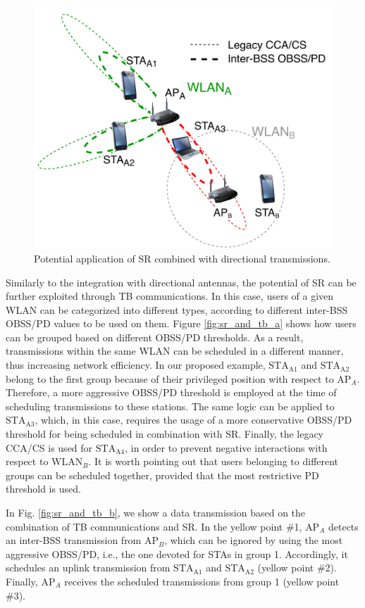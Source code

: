 \documentclass[preprint,12pt]{elsarticle}
\begin{document}
	\begin{figure}[ht!]
		\centering		
		\includegraphics[width=0.4\columnwidth]{sr_and_beamforming}
		\caption{Potential application of SR combined with directional transmissions.}
		\label{fig:sr_and_beamforming}
	\end{figure}
	
	Similarly to the integration with directional antennas, the potential of SR can be further exploited through TB communications. In this case, users of a given WLAN can be categorized into different types, according to different inter-BSS OBSS/PD values to be used on them. Figure \ref{fig:sr_and_tb_a} shows how users can be grouped based on different OBSS/PD thresholds. As a result, transmissions within the same WLAN can be scheduled in a different manner, thus increasing network efficiency. In our proposed example, $\text{STA}_\text{A1}$ and $\text{STA}_\text{A2}$ belong to the first group because of their privileged position with respect to $\text{AP}_A$. Therefore, a more aggressive OBSS/PD threshold is employed at the time of scheduling transmissions to these stations. The same logic can be applied to $\text{STA}_\text{A3}$, which, in this case, requires the usage of a more conservative OBSS/PD threshold for being scheduled in combination with SR. Finally, the legacy CCA/CS is used for $\text{STA}_\text{A4}$, in order to prevent negative interactions with respect to $\text{WLAN}_B$. It is worth pointing out that users belonging to different groups can be scheduled together, provided that the most restrictive PD threshold is used. 
	
	In Fig. \ref{fig:sr_and_tb_b}, we show a data transmission based on the combination of TB communications and SR. In the yellow point \#1, $\text{AP}_A$ detects an inter-BSS transmission from $\text{AP}_B$, which can be ignored by using the most aggressive OBSS/PD, i.e., the one devoted for STAs in group 1. Accordingly, it schedules an uplink transmission from $\text{STA}_\text{A1}$ and $\text{STA}_\text{A2}$ (yellow point \#2). Finally, $\text{AP}_A$ receives the scheduled transmissions from group 1 (yellow point \#3).
	
\end{document}
